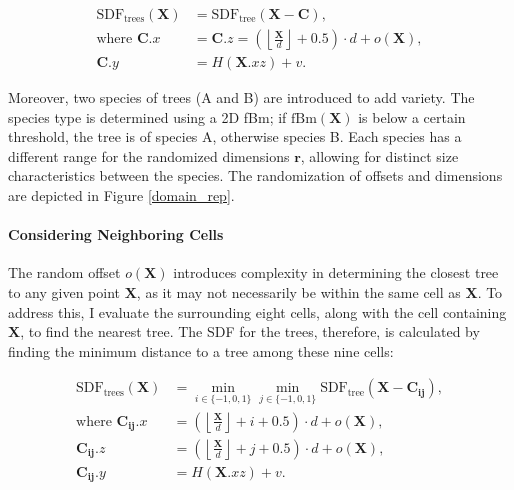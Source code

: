 \begin{equation}
\begin{aligned}
\text{SDF}_\text{trees}(\mathbf{X}) &= \text{SDF}_\text{tree}(\mathbf{X} - \mathbf{C}), \\
\text{where } \mathbf{C}.x &= \mathbf{C}.z = \left(\left\lfloor \frac{\mathbf{X}}{d} \right\rfloor + 0.5\right) \cdot d + o(\mathbf{X}), \\
\mathbf{C}.y &= H(\mathbf{X}.{xz}) + v.
\end{aligned}
\end{equation}

Moreover, two species of trees (A and B) are introduced to add variety. The species type is determined using a 2D fBm; if $\text{fBm}(\mathbf{X})$ is below a certain threshold, the tree is of species A, otherwise species B. Each species has a different range for the randomized dimensions $\mathbf{r}$, allowing for distinct size characteristics between the species. The randomization of offsets and dimensions are depicted in Figure \ref{domain_rep}.

\paragraph{Considering Neighboring Cells}
The random offset $o(\mathbf{X})$ introduces complexity in determining the closest tree to any given point $\mathbf{X}$, as it may not necessarily be within the same cell as $\mathbf{X}$. To address this, I evaluate the surrounding eight cells, along with the cell containing $\mathbf{X}$, to find the nearest tree. The SDF for the trees, therefore, is calculated by finding the minimum distance to a tree among these nine cells:

\begin{equation}
\begin{aligned}
\text{SDF}_\text{trees}(\mathbf{X}) &= \min_{i\in\{-1,0,1\}}\min_{j\in\{-1,0,1\}}\text{SDF}_\text{tree}(\mathbf{X} - \mathbf{C_{ij}}), \\
\text{where } \mathbf{C_{ij}}.x & = \left(\left\lfloor \frac{\mathbf{X}}{d} \right\rfloor + i + 0.5\right) \cdot d + o(\mathbf{X}), \\
\mathbf{C_{ij}}.z & = \left(\left\lfloor \frac{\mathbf{X}}{d} \right\rfloor + j + 0.5\right) \cdot d + o(\mathbf{X}), \\
\mathbf{C_{ij}}.y &= H(\mathbf{X}.{xz}) + v.
\end{aligned}
\end{equation}

